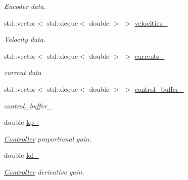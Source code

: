 \begin{DoxyCompactItemize}
\begin{DoxyCompactList}\small\item\em Encoder data. \end{DoxyCompactList}\item 
std\+::vector$<$ std\+::deque$<$ double $>$ $>$ \hyperlink{classblmc__drivers_1_1SinePositionControl_a1ad95cec3a68d2dff06219dff5f83ab8}{velocities\+\_\+}\hypertarget{classblmc__drivers_1_1SinePositionControl_a1ad95cec3a68d2dff06219dff5f83ab8}{}\label{classblmc__drivers_1_1SinePositionControl_a1ad95cec3a68d2dff06219dff5f83ab8}

\begin{DoxyCompactList}\small\item\em Velocity data. \end{DoxyCompactList}\item 
std\+::vector$<$ std\+::deque$<$ double $>$ $>$ \hyperlink{classblmc__drivers_1_1SinePositionControl_ab7903dd177f6dcaa7efa00591ad656d9}{currents\+\_\+}\hypertarget{classblmc__drivers_1_1SinePositionControl_ab7903dd177f6dcaa7efa00591ad656d9}{}\label{classblmc__drivers_1_1SinePositionControl_ab7903dd177f6dcaa7efa00591ad656d9}

\begin{DoxyCompactList}\small\item\em current data \end{DoxyCompactList}\item 
std\+::vector$<$ std\+::deque$<$ double $>$ $>$ \hyperlink{classblmc__drivers_1_1SinePositionControl_a29bd0da456de8a71467de12a3ab42265}{control\+\_\+buffer\+\_\+}\hypertarget{classblmc__drivers_1_1SinePositionControl_a29bd0da456de8a71467de12a3ab42265}{}\label{classblmc__drivers_1_1SinePositionControl_a29bd0da456de8a71467de12a3ab42265}

\begin{DoxyCompactList}\small\item\em control\+\_\+buffer\+\_\+ \end{DoxyCompactList}\item 
double \hyperlink{classblmc__drivers_1_1SinePositionControl_a1b9b44bf55c548c937b4a8ff06d0102d}{kp\+\_\+}\hypertarget{classblmc__drivers_1_1SinePositionControl_a1b9b44bf55c548c937b4a8ff06d0102d}{}\label{classblmc__drivers_1_1SinePositionControl_a1b9b44bf55c548c937b4a8ff06d0102d}

\begin{DoxyCompactList}\small\item\em \hyperlink{classController}{Controller} proportional gain. \end{DoxyCompactList}\item 
double \hyperlink{classblmc__drivers_1_1SinePositionControl_ab48d1f5927551b7856474b92a84859e9}{kd\+\_\+}\hypertarget{classblmc__drivers_1_1SinePositionControl_ab48d1f5927551b7856474b92a84859e9}{}\label{classblmc__drivers_1_1SinePositionControl_ab48d1f5927551b7856474b92a84859e9}

\begin{DoxyCompactList}\small\item\em \hyperlink{classController}{Controller} derivative gain. \end{DoxyCompactList}\end{DoxyCompactItemize}


